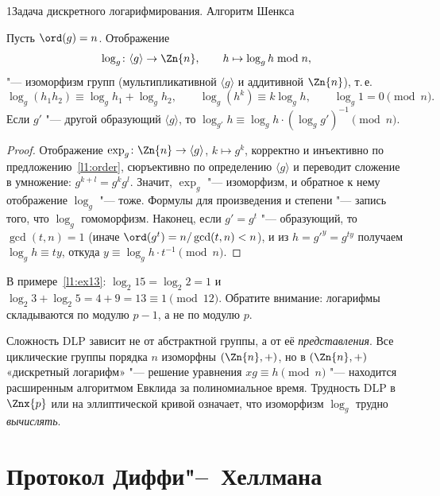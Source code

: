 \begin{lecture}{1}{Задача дискретного логарифмирования. Алгоритм Шенкса}
\begin{proposition}\label{l1:loghom}
Пусть $\ord(g) = n$. Отображение
\[
  \log_g \colon \langle g \rangle \to \Zn{n}, \qquad h \mapsto \log_g h \bmod n,
\]
"--- изоморфизм групп (мультипликативной $\langle g \rangle$ и аддитивной $\Zn{n}$), т.\,е.
\[
  \log_g(h_1 h_2) \equiv \log_g h_1 + \log_g h_2, \qquad \log_g(h^k) \equiv k\log_g h,
  \qquad \log_g 1 = 0 \pmod n.
\]
Если $g'$ "--- другой образующий $\langle g \rangle$, то $\log_{g'} h \equiv \log_g h \cdot
(\log_g g')^{-1} \pmod n$.
\end{proposition}

\begin{proof}
Отображение $\exp_g \colon \Zn{n} \to \langle g \rangle$, $k \mapsto g^k$, корректно и
инъективно по предложению~\ref{l1:order}, сюръективно по определению $\langle g \rangle$ и
переводит сложение в умножение: $g^{k + l} = g^k g^l$. Значит, $\exp_g$ "--- изоморфизм, и
обратное к нему отображение $\log_g$ "--- тоже. Формулы для произведения и степени "--- запись
того, что $\log_g$ гомоморфизм. Наконец, если $g' = g^t$ "--- образующий, то $\gcd(t, n) = 1$
(иначе $\ord(g^t) = n/\gcd(t, n) < n$), и из $h = g'^{y} = g^{ty}$ получаем $\log_g h \equiv
ty$, откуда $y \equiv \log_g h \cdot t^{-1} \pmod n$.
\end{proof}

В примере~\ref{l1:ex13}: $\log_2 15 = \log_2 2 = 1$ и $\log_2 3 + \log_2 5 = 4 + 9 = 13 \equiv 1
\pmod{12}$. Обратите внимание: логарифмы складываются по модулю $p - 1$, а не по модулю $p$.

\begin{remark}
Сложность DLP зависит не от абстрактной группы, а от её \emph{представления}. Все циклические
группы порядка $n$ изоморфны $(\Zn{n}, +)$, но в $(\Zn{n}, +)$ «дискретный логарифм» "---
решение уравнения $xg \equiv h \pmod n$ "--- находится расширенным алгоритмом Евклида за
полиномиальное время. Трудность DLP в $\Znx{p}$ или на эллиптической кривой означает, что
изоморфизм $\log_g$ трудно \emph{вычислять}.
\end{remark}


\section{Протокол Диффи"--~Хеллмана}


\end{lecture}
